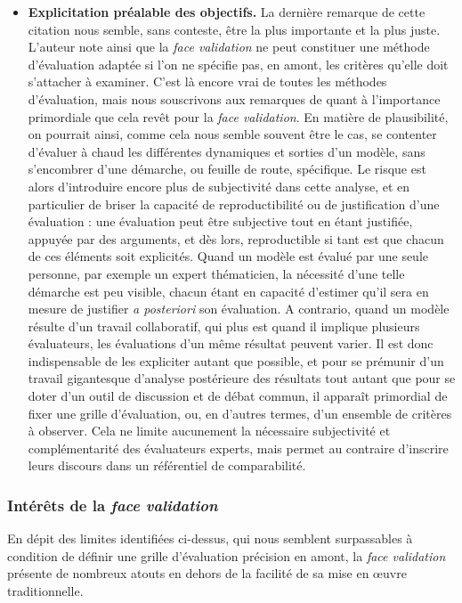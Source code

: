\begin{itemize}
	\item \textbf{Explicitation préalable des objectifs.}
	La dernière remarque de cette citation nous semble, sans conteste, être la plus importante et la plus juste.
	L'auteur note ainsi que la \textit{face validation} ne peut constituer une méthode d'évaluation adaptée si l'on ne spécifie pas, en amont, les critères qu'elle doit s'attacher à examiner.
	C'est là encore vrai de toutes les méthodes d'évaluation, mais nous souscrivons aux remarques de \citeauthor{hermann_validation_1967} quant à l'importance primordiale que cela revêt pour la \textit{face validation}.
	En matière de plausibilité, on pourrait ainsi, comme cela nous semble souvent être le cas, se contenter d'évaluer \og à chaud\fg{} les différentes dynamiques et sorties d'un modèle, sans s'encombrer d'une démarche, ou feuille de route, spécifique.
	Le risque est alors d'introduire encore plus de subjectivité dans cette analyse, et en particulier de briser la capacité de reproductibilité ou de justification d'une évaluation :
	une évaluation peut être subjective tout en étant justifiée, appuyée par des arguments, et dès lors, reproductible si tant est que chacun de ces éléments soit explicités.
	Quand un modèle est évalué par une seule personne, par exemple un expert thématicien, la nécessité d'une telle démarche est peu visible, chacun étant en capacité d'estimer qu'il sera en mesure de justifier \textit{a posteriori} son évaluation.
	A contrario, quand un modèle résulte d'un travail collaboratif, qui plus est quand il implique plusieurs évaluateurs, les évaluations d'un même résultat peuvent varier.
	Il est donc indispensable de les expliciter autant que possible, et pour se prémunir d'un travail gigantesque d'analyse postérieure des résultats tout autant que pour se doter d'un outil de discussion et de débat commun, il apparaît primordial de fixer une grille d'évaluation, ou, en d'autres termes, d'un ensemble de critères à observer.
	Cela ne limite aucunement la nécessaire subjectivité et complémentarité des évaluateurs experts, mais permet au contraire d'inscrire leurs discours dans un référentiel de comparabilité.
	
\end{itemize}

\subsubsection{Intérêts de la \textit{face validation}}

En dépit des limites identifiées ci-dessus, qui nous semblent surpassables à condition de définir une grille d'évaluation précision en amont, la \textit{face validation} présente de nombreux atouts en dehors de la facilité de sa mise en œuvre traditionnelle.

